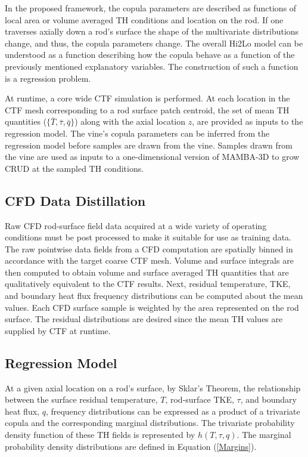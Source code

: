 \documentclass{anstrans}
\begin{document}
In the proposed framework, the copula parameters are described as functions of
local area or volume averaged TH conditions and location on the rod. If
one traverses axially down a rod's surface the shape of the multivariate
distributions change, and thus, the copula parameters change.  The overall Hi2Lo
 model can be understood as a function describing how the copula
behave as a function of the previously mentioned explanatory variables.  The
construction of such a function is a regression problem.

At runtime,
a core wide CTF simulation is performed. At each location in the CTF mesh corresponding to
a rod surface patch centroid, the set of mean TH quantities ($\{ \bar T, \bar \tau, \bar q \}$) along with the axial location $z$,
are provided as inputs to the regression model. The vine's copula
parameters can be inferred from the regression model before samples are drawn from the vine.
Samples drawn from the vine are used as inputs to a
one-dimensional version of MAMBA-3D to grow CRUD at the sampled TH
conditions.

\subsection{CFD Data Distillation}
Raw CFD rod-surface field data acquired at a wide variety of operating conditions must be post processed to
make it suitable for use as training data.  The raw pointwise data fields from a CFD computation
are spatially binned in accordance with the target coarse CTF mesh.  Volume and surface integrals are then computed
to obtain volume and surface averaged TH quantities that are qualitatively equivalent to the CTF results.
Next, residual temperature, TKE, and boundary heat flux frequency distributions can be computed about the mean values.  Each CFD surface sample is weighted by the area represented on the rod surface.
The residual distributions are desired since the mean TH values are
supplied by CTF at runtime.

\subsection{Regression Model} At a given axial location on a rod's surface, by Sklar's Theorem, the relationship between the surface residual temperature, $T$, rod-surface TKE, $\tau$, and boundary heat flux, $q$, frequency distributions can be expressed as a product of a trivariate copula and the corresponding marginal distributions.
The trivariate probability density function of these TH fields is represented by $h(T, \tau, q)$.
The marginal probability density distributions are defined in Equation (\ref{Margins}).
\end{document}
